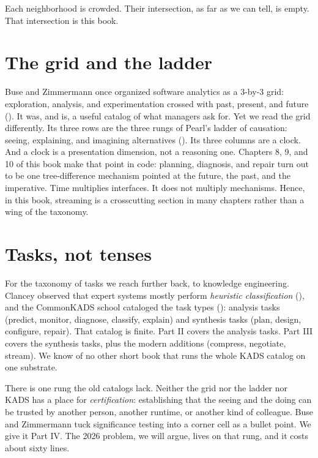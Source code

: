 \documentclass[
  justified]{tufte-book}
\begin{document}
Each neighborhood is crowded. Their intersection, as far as we can tell,
is empty. That intersection is this book.

\section{The grid and the ladder}\label{the-grid-and-the-ladder}

Buse and Zimmermann once organized software analytics as a 3-by-3 grid:
exploration, analysis, and experimentation crossed with past, present,
and future (). It was,
and is, a useful catalog of what managers ask for. Yet we read the grid
differently. Its three rows are the three rungs of Pearl's ladder of
causation: seeing, explaining, and imagining alternatives
(). Its three columns
are a clock. And a clock is a presentation dimension, not a reasoning
one. Chapters 8, 9, and 10 of this book make that point in code:
planning, diagnosis, and repair turn out to be one tree-difference
mechanism pointed at the future, the past, and the imperative. Time
multiplies interfaces. It does not multiply mechanisms. Hence, in this
book, streaming is a crosscutting section in many chapters rather than a
wing of the taxonomy.

\section{Tasks, not tenses}\label{tasks-not-tenses}

For the taxonomy of tasks we reach further back, to knowledge
engineering. Clancey observed that expert systems mostly perform
\emph{heuristic classification} (), and the CommonKADS school cataloged the task types
(): analysis tasks
(predict, monitor, diagnose, classify, explain) and synthesis tasks
(plan, design, configure, repair). That catalog is finite. Part II
covers the analysis tasks. Part III covers the synthesis tasks, plus the
modern additions (compress, negotiate, stream). We know of no other
short book that runs the whole KADS catalog on one substrate.

There is one rung the old catalogs lack. Neither the grid nor the ladder
nor KADS has a place for \emph{certification}: establishing that the
seeing and the doing can be trusted by another person, another runtime,
or another kind of colleague. Buse and Zimmermann tuck significance
testing into a corner cell as a bullet point. We give it Part IV. The
2026 problem, we will argue, lives on that rung, and it costs about
sixty lines.
\end{document}

